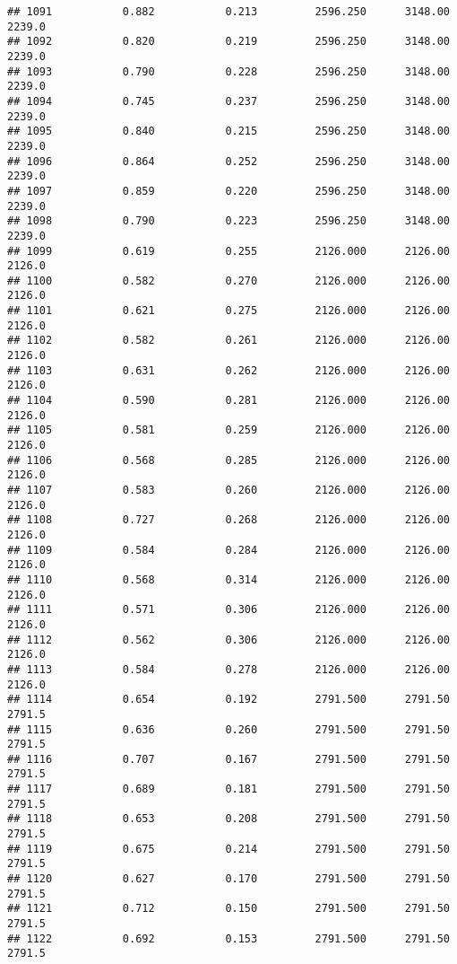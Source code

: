 \documentclass[
]{article}
\begin{document}
\begin{verbatim}
## 1091           0.882           0.213         2596.250      3148.00       2239.0
## 1092           0.820           0.219         2596.250      3148.00       2239.0
## 1093           0.790           0.228         2596.250      3148.00       2239.0
## 1094           0.745           0.237         2596.250      3148.00       2239.0
## 1095           0.840           0.215         2596.250      3148.00       2239.0
## 1096           0.864           0.252         2596.250      3148.00       2239.0
## 1097           0.859           0.220         2596.250      3148.00       2239.0
## 1098           0.790           0.223         2596.250      3148.00       2239.0
## 1099           0.619           0.255         2126.000      2126.00       2126.0
## 1100           0.582           0.270         2126.000      2126.00       2126.0
## 1101           0.621           0.275         2126.000      2126.00       2126.0
## 1102           0.582           0.261         2126.000      2126.00       2126.0
## 1103           0.631           0.262         2126.000      2126.00       2126.0
## 1104           0.590           0.281         2126.000      2126.00       2126.0
## 1105           0.581           0.259         2126.000      2126.00       2126.0
## 1106           0.568           0.285         2126.000      2126.00       2126.0
## 1107           0.583           0.260         2126.000      2126.00       2126.0
## 1108           0.727           0.268         2126.000      2126.00       2126.0
## 1109           0.584           0.284         2126.000      2126.00       2126.0
## 1110           0.568           0.314         2126.000      2126.00       2126.0
## 1111           0.571           0.306         2126.000      2126.00       2126.0
## 1112           0.562           0.306         2126.000      2126.00       2126.0
## 1113           0.584           0.278         2126.000      2126.00       2126.0
## 1114           0.654           0.192         2791.500      2791.50       2791.5
## 1115           0.636           0.260         2791.500      2791.50       2791.5
## 1116           0.707           0.167         2791.500      2791.50       2791.5
## 1117           0.689           0.181         2791.500      2791.50       2791.5
## 1118           0.653           0.208         2791.500      2791.50       2791.5
## 1119           0.675           0.214         2791.500      2791.50       2791.5
## 1120           0.627           0.170         2791.500      2791.50       2791.5
## 1121           0.712           0.150         2791.500      2791.50       2791.5
## 1122           0.692           0.153         2791.500      2791.50       2791.5

\end{verbatim}
\end{document}
